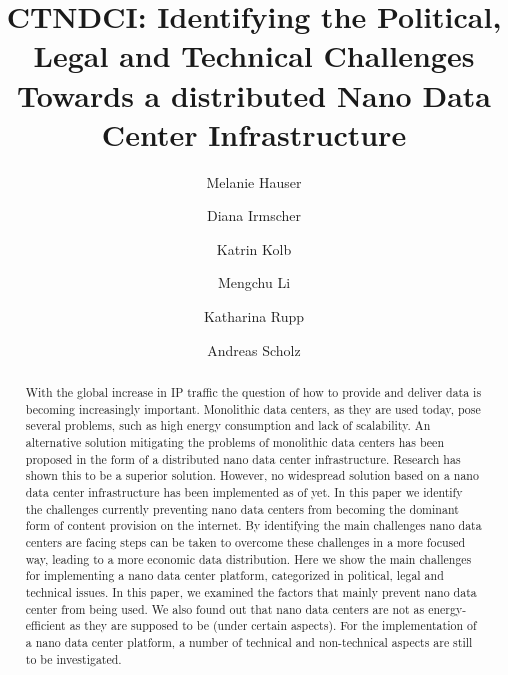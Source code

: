 \documentclass[review=true, screen, acmlarge]{acmart}
\begin{document}
\title{CTNDCI:  Identifying the Political, Legal and Technical Challenges Towards a distributed Nano Data Center Infrastructure} 

\author{Melanie Hauser}

\author{Diana Irmscher}

\author{Katrin Kolb}

\author{Mengchu Li} 

\author{Katharina Rupp}

\author{Andreas Scholz}




\begin{abstract}
With the global increase in IP traffic the question of how to provide and deliver data is becoming increasingly important. Monolithic data centers, as they are used today, pose several problems, such as high energy consumption and lack of scalability.
An alternative solution mitigating the problems of monolithic data centers has been proposed in the form of a distributed nano data center infrastructure. Research has shown this to be a superior solution. 
However, no widespread solution based on a nano data center infrastructure has been implemented as of yet. In this paper we identify the challenges currently preventing nano data centers from becoming the dominant form of content provision on the internet.
By identifying the main challenges nano data centers are facing steps can be taken to overcome these challenges in a more focused way, leading to a more economic data distribution.
Here we show the main challenges for implementing a nano data center platform, categorized in political, legal and technical issues.
In this paper, we examined the factors that mainly prevent nano data center from being used. We also found out that nano data centers are not as energy-efficient as they are supposed to be (under certain aspects).
For the implementation of a nano data center platform, a number of technical and non-technical aspects are still to be investigated.




\end{abstract}
\end{document}
